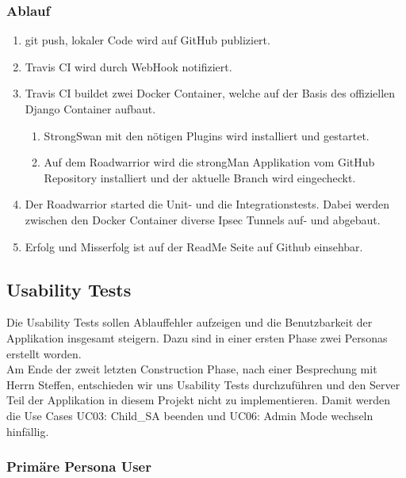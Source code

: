 \subsubsection{Ablauf}
\begin{enumerate}
	\item git push, lokaler Code wird auf GitHub publiziert.
	\item Travis CI wird durch WebHook notifiziert.
	\item Travis CI buildet zwei Docker Container, welche auf der Basis des offiziellen Django Container aufbaut.
	\begin{enumerate}
         \item StrongSwan mit den nötigen Plugins wird installiert und gestartet.
         \item Auf dem Roadwarrior wird die strongMan Applikation vom GitHub Repository installiert und der aktuelle Branch wird eingecheckt.
      \end{enumerate}
      \item Der Roadwarrior started die Unit- und die Integrationstests. Dabei werden zwischen den Docker Container diverse Ipsec Tunnels auf- und abgebaut.
      \item Erfolg und Misserfolg ist auf der ReadMe Seite auf Github einsehbar.
\end{enumerate}

\newpage
\subsection{Usability Tests}

Die Usability Tests sollen Ablauffehler aufzeigen und die Benutzbarkeit der Applikation insgesamt steigern. Dazu sind in einer ersten Phase zwei Personas erstellt worden.
\\
\label{UsabilityEntscheid}
Am Ende der zweit letzten Construction Phase, nach einer Besprechung mit Herrn Steffen, entschieden wir uns Usability Tests durchzuführen und den Server Teil der Applikation in diesem Projekt nicht zu implementieren.
Damit werden die Use Cases UC03: Child\_SA beenden und UC06: Admin Mode wechseln hinfällig.

\subsubsection{Primäre Persona User}

